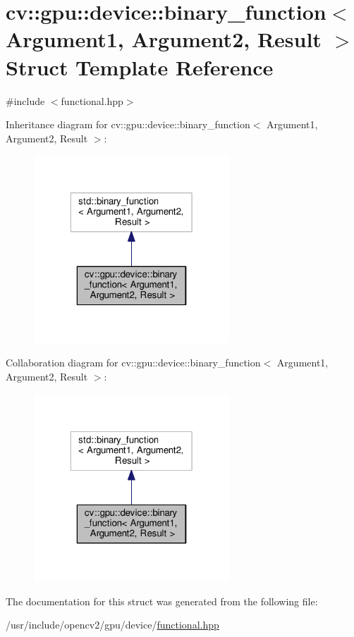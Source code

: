 \hypertarget{structcv_1_1gpu_1_1device_1_1binary__function}{\section{cv\-:\-:gpu\-:\-:device\-:\-:binary\-\_\-function$<$ Argument1, Argument2, Result $>$ Struct Template Reference}
\label{structcv_1_1gpu_1_1device_1_1binary__function}
}


{\ttfamily \#include $<$functional.\-hpp$>$}



Inheritance diagram for cv\-:\-:gpu\-:\-:device\-:\-:binary\-\_\-function$<$ Argument1, Argument2, Result $>$\-:\nopagebreak
\begin{figure}[H]
\begin{center}
\leavevmode
\includegraphics[width=208pt]{structcv_1_1gpu_1_1device_1_1binary__function__inherit__graph}
\end{center}
\end{figure}


Collaboration diagram for cv\-:\-:gpu\-:\-:device\-:\-:binary\-\_\-function$<$ Argument1, Argument2, Result $>$\-:\nopagebreak
\begin{figure}[H]
\begin{center}
\leavevmode
\includegraphics[width=208pt]{structcv_1_1gpu_1_1device_1_1binary__function__coll__graph}
\end{center}
\end{figure}


The documentation for this struct was generated from the following file\-:\begin{DoxyCompactItemize}
\item 
/usr/include/opencv2/gpu/device/\hyperlink{functional_8hpp}{functional.\-hpp}\end{DoxyCompactItemize}
